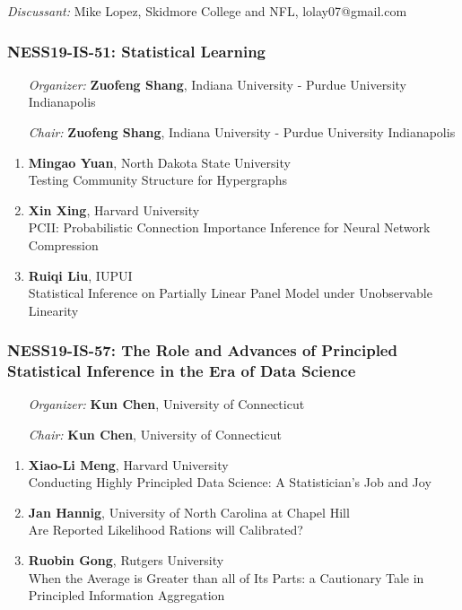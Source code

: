 \emph{Discussant:} Mike Lopez, Skidmore College and NFL, lolay07@gmail.com

\subsubsection*{NESS19-IS-51: Statistical Learning}

\begin{enumerate}[align=left]
\item [\emph{Organizer:}] \textbf{Zuofeng Shang}, Indiana University - Purdue University Indianapolis \\
\item [\emph{Chair:}] \textbf{Zuofeng Shang}, Indiana University - Purdue University Indianapolis
\end{enumerate}

\begin{enumerate}
\item \textbf{Mingao Yuan}, North Dakota State University \\
Testing Community Structure for Hypergraphs
\item \textbf{Xin Xing}, Harvard University \\
PCII: Probabilistic Connection Importance Inference for Neural Network Compression
\item \textbf{Ruiqi Liu}, IUPUI \\
Statistical Inference on Partially Linear Panel Model under Unobservable Linearity
\end{enumerate}

\subsubsection*{NESS19-IS-57: The Role and Advances of Principled Statistical Inference in the Era of Data Science}

\begin{enumerate}[align=left]
\item [\emph{Organizer:}] \textbf{Kun Chen}, University of Connecticut \\
\item [\emph{Chair:}] \textbf{Kun Chen}, University of Connecticut
\end{enumerate}

\begin{enumerate}
\item \textbf{Xiao-Li Meng}, Harvard University \\
Conducting Highly Principled Data Science: A Statistician's Job and Joy
\item \textbf{Jan Hannig}, University of North Carolina at Chapel Hill \\
Are Reported Likelihood Rations will Calibrated?
\item \textbf{Ruobin Gong}, Rutgers University \\
When the Average is Greater than all of Its Parts: a Cautionary Tale in Principled Information Aggregation
\end{enumerate}


